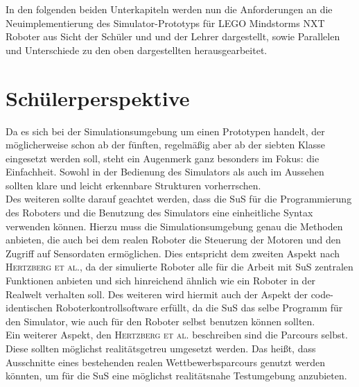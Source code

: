 \documentclass[paper=a4, pagesize, DIV=calc, BCOR=12.5mm, twoside=on, onecolumn=on, open = any, titlepage =on, parskip =half-, headsepline = on, footsepline = on, chapterprefix = on, appendixprefix = off, fontsize = 12pt, numbers = noenddot, abstract = on]{scrbook}
\numberwithin{equation}{chapter}
\theoremstyle{definition}
\theoremstyle{plain}
\theoremstyle{plain}
\theoremstyle{remark}
\theoremstyle{plain}
\theoremstyle{plain}
\begin{document}
In den folgenden beiden Unterkapiteln werden nun die Anforderungen an die Neuimplementierung des Simulator-Prototyps für LEGO Mindstorms NXT Roboter aus Sicht der Schüler und und der Lehrer dargestellt, sowie Parallelen und Unterschiede zu den oben dargestellten herausgearbeitet.

\section{Schülerperspektive}
\label{sec:schüler}
\onehalfspacing
Da es sich bei der Simulationsumgebung um einen Prototypen handelt, der möglicherweise schon ab der fünften, regelmäßig aber ab der siebten Klasse eingesetzt werden soll, steht ein Augenmerk ganz besonders im Fokus: die Einfachheit. Sowohl in der Bedienung des Simulators als auch im Aussehen sollten klare und leicht erkennbare Strukturen vorherrschen.\\
Des weiteren sollte darauf geachtet werden, dass die SuS für die Programmierung des Roboters und die Benutzung des Simulators eine einheitliche Syntax verwenden können. Hierzu muss die Simulationsumgebung genau die Methoden anbieten, die auch bei dem realen Roboter die Steuerung der Motoren und den Zugriff auf Sensordaten ermöglichen. Dies entspricht dem zweiten Aspekt nach \textsc{Hertzberg et al.}, da der simulierte Roboter alle für die Arbeit mit SuS zentralen Funktionen anbieten und sich hinreichend ähnlich wie ein Roboter in der Realwelt verhalten soll. Des weiteren wird hiermit auch der Aspekt der code-identischen Roboterkontrollsoftware erfüllt, da die SuS das selbe Programm für den Simulator, wie auch für den Roboter selbst benutzen können sollten.\\
Ein weiterer Aspekt, den \textsc{Hertzberg et al.} beschreiben sind die Parcours selbst. Diese sollten möglichst realitätsgetreu umgesetzt werden. Das heißt, dass Ausschnitte eines bestehenden realen Wettbewerbsparcours genutzt werden könnten, um für die SuS eine möglichst realitätsnahe Testumgebung anzubieten.\\
\par \singlespacing
\end{document}
